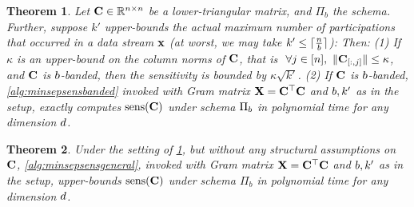 \documentclass{article}
\newtheorem{theorem}{Theorem}
\begin{document}


\newcommand{\indpi}{u(\pi)}

\begin{theorem}\label{thm:minsepsens}
Let $\mathbf{C} \in \mathbb{R}^{n \times n}$ be a lower-triangular matrix, and $\Pi_b$ the \bparticipation schema.  Further, suppose $k'$ upper-bounds the actual maximum number of participations that occurred in a data stream $\mathbf{x}$ (at worst, we may take $k' \le \lceil\frac{n}{b}\rceil$):
Then:
(1) If $\kappa$ is an upper-bound on the column norms of $\mathbf{C}$, that is $\ \forall j \in [n], \ \norm{\bfC\idx{:}{j}} \le \kappa$,  and $\mathbf{C}$ is $b$-banded, then the sensitivity is bounded by $\kappa \sqrt{k'}$.
(2) If $\mathbf{C}$ is $b$-banded, \cref{alg:minsepsensbanded} invoked with Gram matrix $\mathbf{X} = \mathbf{C}^\top\mathbf{C}$ and $b, k'$ as in the setup, exactly computes $\operatorname{sens}(\mathbf{C})$ under schema $\Pi_{b}$ in polynomial time for any dimension $d$.
\end{theorem}
%
\begin{theorem}\label{thm:minsepsensgen}
Under the setting of \cref{thm:minsepsens}, but without any structural assumptions on $\mathbf{C}$, \cref{alg:minsepsensgeneral}, invoked with Gram matrix $\mathbf{X} = \mathbf{C}^\top\mathbf{C}$ and $b, k'$ as in the setup, upper-bounds $\operatorname{sens}(\mathbf{C})$ under schema $\Pi_b$ in polynomial time for any dimension $d$.%
\end{theorem}
\end{document}
